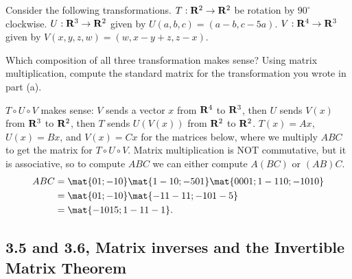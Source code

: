 \begin{problems}
\problem Consider the following transformations. \newline %
$T: {\bf R}^2 \to {\bf R}^2$ be rotation by $90^\circ$ clockwise.
\newline %
$U: {\bf R}^3 \to {\bf R}^2$ given by $U(a, b, c) = (a-b, c-5a)$.
\newline %
$V: {\bf R}^{4} \to {\bf R}^3$ given by
$V(x, y, z, w) = (w, x-y+z, z-x)$.
\begin{subproblems}
  \subproblem Which composition of all three transformation makes
  sense? %
  \subproblem Using matrix multiplication, compute the standard
  matrix for the transformation you wrote in part (a).
\end{subproblems}

\begin{solution}
  \begin{subproblems}
    \subproblem $T \circ U \circ V$ makes sense: $V$ sends a vector
    $x$ from ${\bf R}^4$ to ${\bf R}^3$, then $U$ sends $V(x)$ from
    ${\bf R}^3$ to ${\bf R}^2$, then $T$ sends $U(V(x))$ from
    ${\bf R}^2$ to ${\bf R}^2$. %
    \subproblem $T(x) = Ax$, $U(x) = Bx$, and $V(x) = Cx$ for the
    matrices below, where we multiply $ABC$ to get the matrix for
    $T \circ U \circ V$.  Matrix multiplication is NOT commutative,
    but it is associative, so to compute $ABC$ we can either compute
    $A(BC)$ or $(AB)C$.
    \begin{align*}
      ABC 
      &
        = \mat{0 1; -1 0}
        \mat{1 -1 0; -5 0 1}
        \mat{0 0 0 1; 1 -1 1 0; -1 0 1 0} \\
      &
        = \mat{0 1; -1 0}
        \mat{-1 1 -1 1; -1 0 1 -5} \\
      &
        = \mat{-1 0 1 5; 1 -1 1 -1}.
    \end{align*}
  \end{subproblems}
\end{solution}


\end{problems} \setcounter{problem}{0}

\newpage

\subsection{3.5 and 3.6, Matrix inverses and the Invertible Matrix Theorem}

